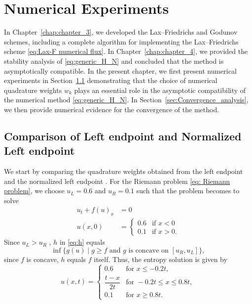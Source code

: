 \chapter{Numerical Experiments}\label{chap:chapter_5}
In Chapter~\ref{chap:chapter_3}, we developed the Lax--Friedrichs and Godunov schemes, including a complete algorithm for implementing the Lax--Friedrichs scheme \eqref{eq:Lax-F numerical flux}. In Chapter~\ref{chap:chapter_4}, we provided the stability analysis of \eqref{eq:generic_H_N} and concluded that the method is asymptotically compatible. In the present chapter, we first present numerical experiments in Section~\ref{sec:Comparison_left_Normalized} demonstrating that the choice of numerical quadrature weights $w_k$ plays an essential role in the asymptotic compatibility of the numerical method \eqref{eq:generic_H_N}. In Section~\ref{sec:Convergence_analysis}, we then provide numerical evidence for the convergence of the method.

\section{Comparison of Left endpoint  and Normalized Left endpoint}\label{sec:Comparison_left_Normalized}
We start by comparing the quadrature weights obtained from the left endpoint  and the normalized left endpoint .
For the Riemann problem \eqref{eq: Riemann problem}, we choose $u_L = 0.6$ and $u_R = 0.1$ such that the problem becomes to solve
\begin{equation}\label{eq:sloving rarefaction}
    \begin{split}
        u_{t} + f(u)_{x} & = 0 \\
        u(x,0)           & =
        \begin{cases}
            0.6 & \text{if } x < 0  \\
            0.1 & \text{if } x > 0.
        \end{cases}
    \end{split}
\end{equation}
Since $u_L > u_R $ , $h$ in \eqref{eq:h} equals
\[
    \inf\{ g(u) \mid g \geq f \text{ and } g \text{ is concave on } [u_R, u_L] \},
\]
since $f$ is concave, $h$ equals $f$ itself. Thus, the entropy solution is given by
\begin{equation}\label{eq: u_L > u_R}
    u(x,t) =
    \begin{cases}
        0.6               & \text{for } x \leq -0.2t,           \\
        \dfrac{t - x}{2t} & \text{for } -0.2t \leq x \leq 0.8t, \\
        0.1               & \text{for } x \geq 0.8t.
    \end{cases}
\end{equation}


